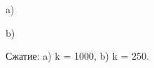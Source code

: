 \documentclass[a5paper, 10pt]{article}
\theoremstyle{definition}
\theoremstyle{plain}
\theoremstyle{remark}
\begin{document}
\begin{figure}[h]
\begin{minipage}[h]{1\linewidth}
 a) \\
\end{minipage}
\begin{minipage}[h]{1\linewidth}
 b) \\
\end{minipage}
\caption{Сжатие: a) k = 1000, b) k = 250.}
\end{figure}
\end{document}
